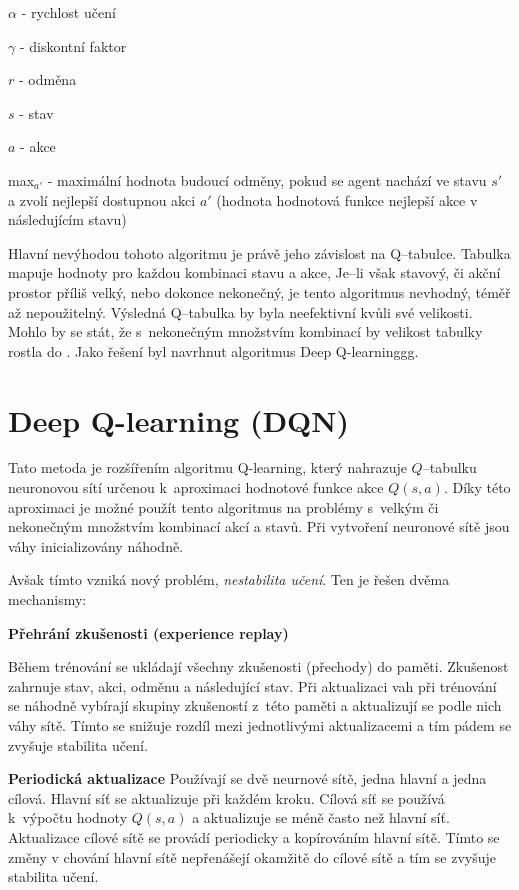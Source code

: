 \begin{myitemize}
  \item $\alpha$ - rychlost učení
  \item $\gamma$ - diskontní faktor
  \item $r$ - odměna
  \item $s$ - stav
  \item $a$ - akce
  \item max$_{a'}$ - maximální hodnota budoucí odměny, pokud se agent nachází ve stavu $s'$ a zvolí nejlepší dostupnou akci $a'$ (hodnota hodnotová funkce nejlepší akce v následujícím stavu)
\end{myitemize}

Hlavní nevýhodou tohoto algoritmu je právě jeho závislost na Q--tabulce.
Tabulka mapuje hodnoty pro každou kombinaci stavu a akce,
Je--li však stavový, či akční prostor příliš velký, nebo dokonce nekonečný, je tento algoritmus nevhodný, téměř až nepoužitelný.
Výsledná Q--tabulka by byla neefektivní kvůli své velikosti.
Mohlo by se stát, že s~nekonečným množstvím kombinací by velikost tabulky rostla do .
Jako řešení byl navrhnut algoritmus Deep Q-learninggg.

\section{Deep Q-learning (DQN)}\label{subsec:deep-q-learning}

Tato metoda je rozšířením algoritmu Q-learning, který nahrazuje $Q$--tabulku neuronovou sítí určenou k~aproximaci hodnotové funkce akce $Q(s, a)$.
Díky této aproximaci je možné použít tento algoritmus na problémy s~velkým či nekonečným množstvím kombinací akcí a stavů.
Při vytvoření neuronové sítě jsou váhy inicializovány náhodně.

Avšak tímto vzniká nový problém, \emph{nestabilita učení}.
Ten je řešen dvěma mechanismy:

\begin{myitemize}
  \item \textbf{Přehrání zkušenosti (experience replay)}
  
  Během trénování se ukládají všechny zkušenosti (přechody) do paměti.
  Zkušenost zahrnuje stav, akci, odměnu a následující stav.
  Při aktualizaci vah při trénování se náhodně vybírají skupiny zkušeností z~této paměti a aktualizují se podle nich váhy sítě.
  Tímto se snižuje rozdíl mezi jednotlivými aktualizacemi a tím pádem se zvyšuje stabilita učení.

  \item \textbf{Periodická aktualizace}
  Používají se dvě neurnové sítě, jedna hlavní a jedna cílová.
  Hlavní síť se aktualizuje při každém kroku.
  Cílová síť se používá k~výpočtu hodnoty $Q(s, a)$ a aktualizuje se méně často než hlavní síť.
  Aktualizace cílové sítě se provádí periodicky a kopírováním hlavní sítě.
  Tímto se změny v chování hlavní sítě nepřenášejí okamžitě do cílové sítě a tím se zvyšuje stabilita učení.

\end{myitemize}

